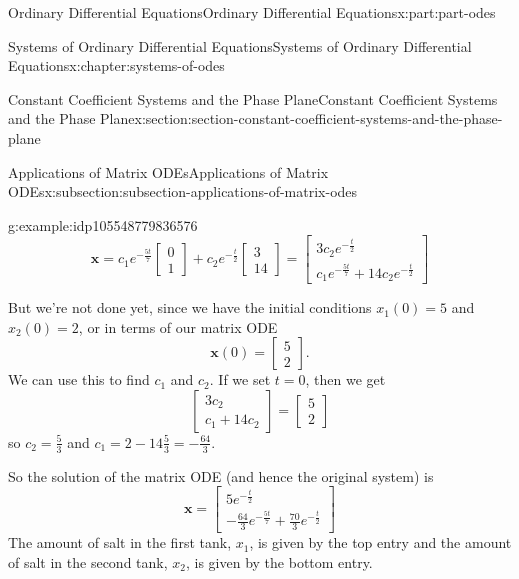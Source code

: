 \documentclass[oneside,10pt,]{book}
\numberwithin{equation}{part}
\renewcommand{\vec}[1]{\mathbf{#1}}
\begin{document}
\begin{partptx}{Ordinary Differential Equations}{}{Ordinary Differential Equations}{}{}{x:part:part-odes}
\begin{chapterptx}{Systems of Ordinary Differential Equations}{}{Systems of Ordinary Differential Equations}{}{}{x:chapter:systems-of-odes}
\begin{sectionptx}{Constant Coefficient Systems and the Phase Plane}{}{Constant Coefficient Systems and the Phase Plane}{}{}{x:section:section-constant-coefficient-systems-and-the-phase-plane}
\begin{subsectionptx}{Applications of Matrix ODEs}{}{Applications of Matrix ODEs}{}{}{x:subsection:subsection-applications-of-matrix-odes}
\begin{example}{}{g:example:idp105548779836576}
\begin{equation*}
\vec{x} = c_{1}e^{-\frac{5t}{7}}\begin{bmatrix}0\\1\end{bmatrix} + c_{2}e^{-\frac{t}{2}}\begin{bmatrix}3\\14\end{bmatrix} = \begin{bmatrix}3c_{2}e^{-\frac{t}{2}} \\ c_{1}e^{-\frac{5t}{7}}+14c_{2}e^{-\frac{t}{2}}\end{bmatrix}
\end{equation*}
%
\par
But we're not done yet, since we have the initial conditions \(x_{1}(0) = 5\) and \(x_{2}(0) = 2\), or in terms of our matrix ODE%
\begin{equation*}
\vec{x}(0) = \begin{bmatrix}5\\2\end{bmatrix}.
\end{equation*}
We can use this to find \(c_{1}\) and \(c_{2}\). If we set \(t=0\), then we get%
\begin{equation*}
\begin{bmatrix}3c_{2} \\ c_{1} + 14c_{2}\end{bmatrix} = \begin{bmatrix}5\\2\end{bmatrix}
\end{equation*}
so \(c_{2} = \frac{5}{3}\) and \(c_{1} = 2 - 14\frac{5}{3} = -\frac{64}{3}\).%
\par
So the solution of the matrix ODE (and hence the original system) is%
\begin{equation*}
\vec{x} = \begin{bmatrix}5e^{-\frac{t}{2}} \\ -\frac{64}{3}e^{-\frac{5t}{7}}+\frac{70}{3}e^{-\frac{t}{2}}\end{bmatrix}
\end{equation*}
The amount of salt in the first tank, \(x_{1}\), is given by the top entry and the amount of salt in the second tank, \(x_{2}\), is given by the bottom entry.%
\end{example}
\end{subsectionptx}
%
%
\typeout{************************************************}

\end{sectionptx}
\end{chapterptx}
\end{partptx}
\end{document}
